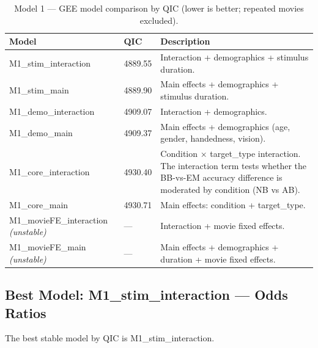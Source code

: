 \documentclass[12pt,a4paper]{article}
\begin{document}
\begin{table}[H]
\centering
\small
\begin{tabular}{llp{7cm}}
\hline
\textbf{Model} & \textbf{QIC} & \textbf{Description} \\
\hline

    M1\_stim\_interaction & 4889.55 & Interaction + demographics + stimulus duration. \\

    M1\_stim\_main & 4889.90 & Main effects + demographics + stimulus duration. \\

    M1\_demo\_interaction & 4909.07 & Interaction + demographics. \\

    M1\_demo\_main & 4909.37 & Main effects + demographics (age, gender, handedness, vision). \\

    M1\_core\_interaction & 4930.40 & Condition × target\_type interaction. The interaction term tests whether the BB-vs-EM accuracy difference is moderated by condition (NB vs AB). \\

    M1\_core\_main & 4930.71 & Main effects: condition + target\_type. \\

    M1\_movieFE\_interaction \textit{(unstable)} & --- & Interaction + movie fixed effects. \\

    M1\_movieFE\_main \textit{(unstable)} & --- & Main effects + demographics + duration + movie fixed effects. \\

\hline
\end{tabular}
\caption{Model 1 --- GEE model comparison by QIC (lower is better; repeated movies excluded).}
\end{table}

\subsection{Best Model: M1\_stim\_interaction --- Odds Ratios}

The best stable model by QIC is M1\_stim\_interaction.
\end{document}
